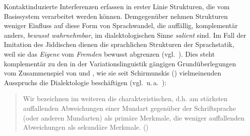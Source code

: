 Kontaktinduzierte Interferenzen erfassen in erster Linie Strukturen, die vom Basissystem verarbeitet werden können. Demgegenüber nehmen Strukturen weniger Einfluss auf diese Form von Sprachwandel, die auffällig, komplementär anders, \textit{bewusst wahrnehmbar}, im dialektologischen Sinne \textit{salient} sind. Im Fall der Imitation des Jiddischen dienen die sprachlichen Strukturen der Sprachstatik, weil sie das \textit{Eigene} vom \textit{Fremden} bewusst abgrenzen (vgl.\, \citealt[70]{Guenthner2002}). Dies steht komplementär zu den in der Variationslinguistik gängigen Grundüberlegungen vom Zusammenspiel von  und , wie sie seit Schirmunskis (\citeyear[118]{Schirmunski1930}) vielmeinenden Ausspruchs die Dialektologie beschäftigen (vgl.\, u.\,a.\, \citealt{HerrgenSchmidt1985,Lenz2010,Elmentaleretal2010,Purschke2011,Purschke2014,Kiesewalter2011,Kiesewalter2014,Hettler2014,Auer2014,Glauninger2014,AndersPalliwodaSchroeder2014,Lorenz2014}): 


\begin{quote}
Wir bezeichnen im weiteren die charakteristischen, d.h. am stärksten auffallenden Abweichungen einer Mundart gegenüber der Schriftsprache (oder anderen Mundarten) als primäre Merkmale, die weniger auffallenden Abweichungen als sekundäre Merkmale. (\citealt[118]{Schirmunski1930})
\end{quote}


